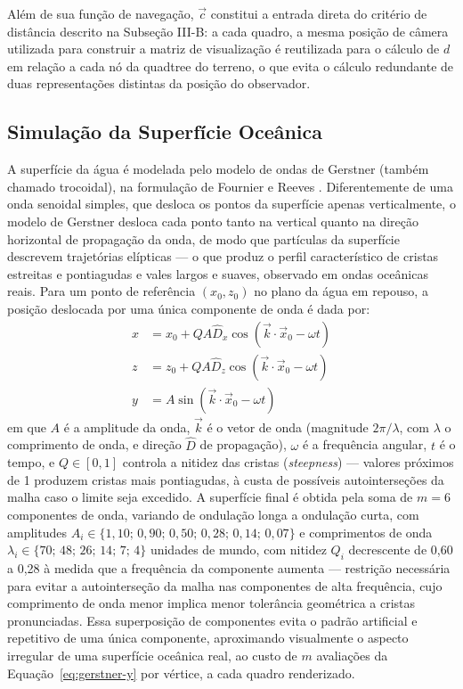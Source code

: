 \documentclass[conference]{IEEEtran}
\begin{document}
Além de sua função de navegação, $\vec{c}$ constitui a entrada direta do
critério de distância descrito na Subseção III-B: a cada quadro, a mesma
posição de câmera utilizada para construir a matriz de visualização é
reutilizada para o cálculo de $d$ em relação a cada nó da quadtree do
terreno, o que evita o cálculo redundante de duas representações
distintas da posição do observador.

\subsection{Simulação da Superfície Oceânica}

A superfície da água é modelada pelo modelo de ondas de Gerstner (também
chamado trocoidal), na formulação de Fournier e Reeves
\cite{fournierreeves1986}. Diferentemente de uma onda senoidal simples,
que desloca os pontos da superfície apenas verticalmente, o modelo de
Gerstner desloca cada ponto tanto na vertical quanto na direção
horizontal de propagação da onda, de modo que partículas da superfície
descrevem trajetórias elípticas --- o que produz o perfil característico
de cristas estreitas e pontiagudas e vales largos e suaves, observado em
ondas oceânicas reais. Para um ponto de referência $(x_0, z_0)$ no plano
da água em repouso, a posição deslocada por uma única componente de onda
é dada por:
\begin{align}
x &= x_0 + Q A \hat{D}_x \cos(\vec{k} \cdot \vec{x}_0 - \omega t) \label{eq:gerstner-x}\\
z &= z_0 + Q A \hat{D}_z \cos(\vec{k} \cdot \vec{x}_0 - \omega t) \label{eq:gerstner-z}\\
y &= A \sin(\vec{k} \cdot \vec{x}_0 - \omega t) \label{eq:gerstner-y}
\end{align}
em que $A$ é a amplitude da onda, $\vec{k}$ é o vetor de onda (magnitude
$2\pi/\lambda$, com $\lambda$ o comprimento de onda, e direção $\hat{D}$
de propagação), $\omega$ é a frequência angular, $t$ é o tempo, e
$Q \in [0,1]$ controla a nitidez das cristas (\emph{steepness}) ---
valores próximos de 1 produzem cristas mais pontiagudas, à custa de
possíveis autointerseções da malha caso o limite seja excedido. A
superfície final é obtida pela soma de $m = 6$ componentes de onda,
variando de ondulação longa a ondulação curta, com amplitudes
$A_i \in \{1{,}10;\, 0{,}90;\, 0{,}50;\, 0{,}28;\, 0{,}14;\, 0{,}07\}$ e
comprimentos de onda $\lambda_i \in \{70;\, 48;\, 26;\, 14;\, 7;\, 4\}$
unidades de mundo, com nitidez $Q_i$ decrescente de 0,60 a 0,28 à medida
que a frequência da componente aumenta --- restrição necessária para
evitar a autointerseção da malha nas componentes de alta frequência, cujo
comprimento de onda menor implica menor tolerância geométrica a cristas
pronunciadas. Essa superposição de componentes evita o padrão artificial
e repetitivo de uma única componente, aproximando visualmente o aspecto
irregular de uma superfície oceânica real, ao custo de $m$ avaliações da
Equação~\eqref{eq:gerstner-y} por vértice, a cada quadro renderizado.
\end{document}
